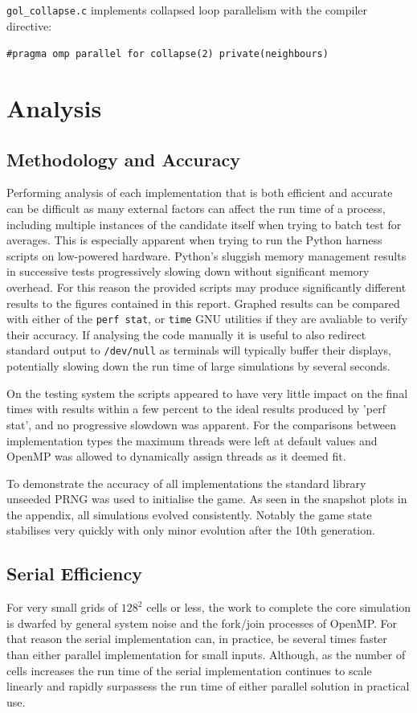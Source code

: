 \documentclass[]{article}
\begin{document}
\noindent
\texttt{gol\_collapse.c} implements collapsed loop parallelism with the compiler directive:

\begin{quoting}
\noindent\texttt{\#pragma omp parallel for collapse(2) private(neighbours)}
\end{quoting}

\section{Analysis}
\subsection{Methodology and Accuracy}
Performing analysis of each implementation that is both efficient and accurate can be difficult as many external factors can affect the run time of a process, including multiple instances of the candidate itself when trying to batch test for averages. This is especially apparent when trying to run the Python harness scripts on low-powered hardware. Python's sluggish memory management results in successive tests progressively slowing down without significant memory overhead. For this reason the provided scripts may produce significantly different results to the figures contained in this report. Graphed results can be compared with either of the \texttt{perf stat}, or \texttt{time} GNU utilities if they are avaliable to verify their accuracy. If analysing the code manually it is useful to also redirect standard output to \texttt{/dev/null} as terminals will typically buffer their displays, potentially slowing down the run time of large simulations by several seconds.

On the testing system the scripts appeared to have very little impact on the final times with results within a few percent to the ideal results produced by 'perf stat', and no progressive slowdown was apparent. For the comparisons between implementation types the maximum threads were left at default values and OpenMP was allowed to dynamically assign threads as it deemed fit.

To demonstrate the accuracy of all implementations the standard library unseeded PRNG was used to initialise the game. As seen in the snapshot plots in the appendix, all simulations evolved consistently. Notably the game state stabilises very quickly with only minor evolution after the 10th generation.

\subsection{Serial Efficiency}
For very small grids of $128^2$ cells or less, the work to complete the core simulation is dwarfed by general system noise and the fork/join processes of OpenMP. For that reason the serial implementation can, in practice, be several times faster than either parallel implementation for small inputs. Although, as the number of cells increases the run time of the serial implementation continues to scale linearly and rapidly surpassess the run time of either parallel solution in practical use.
\end{document}
